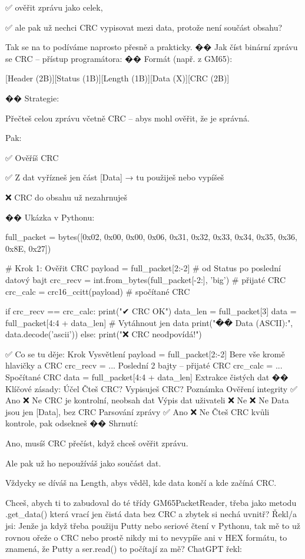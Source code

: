         ✅ ověřit zprávu jako celek,

        ✅ ale pak už nechci CRC vypisovat mezi data, protože není součást obsahu?

Tak se na to podíváme naprosto přesně a prakticky.
�� Jak číst binární zprávu se CRC – přístup programátora:
�� Formát (např. z GM65):

[Header (2B)][Status (1B)][Length (1B)][Data (X)][CRC (2B)]

�� Strategie:

    Přečteš celou zprávu včetně CRC – abys mohl ověřit, že je správná.

    Pak:

        ✅ Ověříš CRC

        ✅ Z dat vyřízneš jen část [Data] → tu použiješ nebo vypíšeš

        ❌ CRC do obsahu už nezahrnuješ

�� Ukázka v Pythonu:

full_packet = bytes([0x02, 0x00, 0x00, 0x06, 0x31, 0x32, 0x33, 0x34, 0x35, 0x36, 0x8E, 0x27])

# Krok 1: Ověřit CRC
payload = full_packet[2:-2]  # od Status po poslední datový bajt
crc_recv = int.from_bytes(full_packet[-2:], 'big')  # přijaté CRC
crc_calc = crc16_ccitt(payload)  # spočítané CRC

if crc_recv == crc_calc:
    print("✔ CRC OK")
    data_len = full_packet[3]
    data = full_packet[4:4 + data_len]  # Vytáhnout jen data
    print("�� Data (ASCII):", data.decode('ascii'))
else:
    print("❌ CRC neodpovídá!")

✅ Co se tu děje:
Krok	Vysvětlení
payload = full_packet[2:-2]	Bere vše kromě hlavičky a CRC
crc_recv = ...	Poslední 2 bajty – přijaté CRC
crc_calc = ...	Spočítané CRC
data = full_packet[4:4 + data_len]	Extrakce čistých dat
�� Klíčové zásady:
Účel	Čteš CRC?	Vypisuješ CRC?	Poznámka
Ověření integrity	✅ Ano	❌ Ne	CRC je kontrolní, neobsah dat
Výpis dat uživateli	❌ Ne	❌ Ne	Data jsou jen [Data], bez CRC
Parsování zprávy	✅ Ano	❌ Ne	Čteš CRC kvůli kontrole, pak odsekneš
�� Shrnutí:

    Ano, musíš CRC přečíst, když chceš ověřit zprávu.

    Ale pak už ho nepoužíváš jako součást dat.

    Vždycky se díváš na Length, abys věděl, kde data končí a kde začíná CRC.

Chceš, abych ti to zabudoval do té třídy GM65PacketReader, třeba jako metodu .get_data() která vrací jen čistá data bez CRC a zbytek si nechá uvnitř?
Řekl/a jsi:
Jenže ja když třeba použiju Putty nebo seriové čtení v Pythonu, tak mě to už rovnou ořeže o CRC nebo prostě nikdy mi to nevypíše ani v HEX formátu, to znamená, že Putty a ser.read() to počítají za mě? 
ChatGPT řekl:

